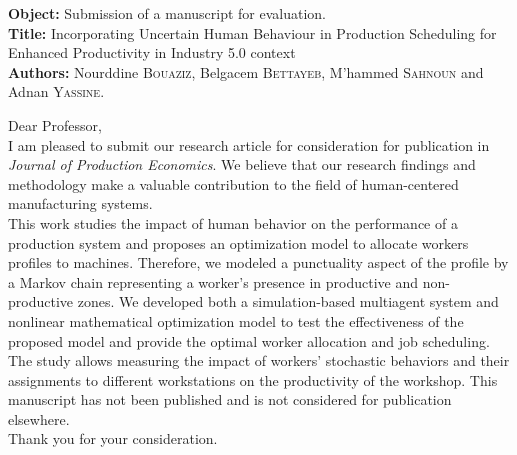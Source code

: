 \documentclass[a4,12pt]{article}
\begin{document}
	\begin{minipage}{\textwidth}
		\textbf{Object:} Submission of a manuscript for evaluation.\\
  \textbf{Title:} Incorporating Uncertain Human Behaviour in Production Scheduling for Enhanced Productivity in Industry 5.0 context\\
		\textbf{Authors:} Nourddine  \textsc{Bouaziz}, Belgacem \textsc{Bettayeb}, M'hammed \textsc{Sahnoun} and Adnan \textsc{Yassine}.
		\vspace{10mm} 
		
		Dear Professor,\\
  
		\hspace{1cm} I am pleased to submit our research article for consideration for publication in \textit{Journal of Production Economics}. We believe that our research findings and methodology make a valuable contribution to the field of human-centered manufacturing systems.\\ 
		
		\hspace{1cm} 
 This work studies the impact of human behavior on the performance of a production system and proposes an optimization model to allocate workers profiles to machines. Therefore, we modeled a punctuality aspect of the profile by a Markov chain representing a worker's presence in productive and non-productive zones. We developed both a simulation-based multiagent system and nonlinear mathematical optimization model to test the effectiveness of the proposed model and provide the optimal worker allocation and job scheduling. The study allows measuring the impact of workers' stochastic behaviors and their assignments to different workstations on the productivity of the workshop. 
		\newline
		\newline
\hspace*{1cm}This manuscript has not been published and is not considered for publication elsewhere.\\
		
		
		Thank you for your consideration.
		
		
	\end{minipage}
	
	
\end{document}
